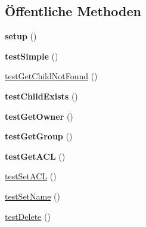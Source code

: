 \subsection*{Öffentliche Methoden}
\begin{DoxyCompactItemize}
\item 
\mbox{\label{class_sabre_1_1_cal_d_a_v_1_1_calendar_home_test_a7abe5412cf17b2038178a631d94a75e1}} 
{\bfseries setup} ()
\item 
\mbox{\label{class_sabre_1_1_cal_d_a_v_1_1_calendar_home_test_afb3e1407821b7b422ea7770ed8153c02}} 
{\bfseries test\+Simple} ()
\item 
\mbox{\hyperlink{class_sabre_1_1_cal_d_a_v_1_1_calendar_home_test_abed1f9c47c720f7e3d31291406a55f22}{test\+Get\+Child\+Not\+Found}} ()
\item 
\mbox{\label{class_sabre_1_1_cal_d_a_v_1_1_calendar_home_test_a83dc6b934462b22f061f1d2e5f73f0bf}} 
{\bfseries test\+Child\+Exists} ()
\item 
\mbox{\label{class_sabre_1_1_cal_d_a_v_1_1_calendar_home_test_aa35e826fcc22ac5b115dfbd2ee6d82a6}} 
{\bfseries test\+Get\+Owner} ()
\item 
\mbox{\label{class_sabre_1_1_cal_d_a_v_1_1_calendar_home_test_ac76802f94b483750b21ca3561fda4157}} 
{\bfseries test\+Get\+Group} ()
\item 
\mbox{\label{class_sabre_1_1_cal_d_a_v_1_1_calendar_home_test_ada46a6b42a5d9ec89161c5c965c2e7bc}} 
{\bfseries test\+Get\+A\+CL} ()
\item 
\mbox{\hyperlink{class_sabre_1_1_cal_d_a_v_1_1_calendar_home_test_a649ff5dfcd570f1766972e843d3068ae}{test\+Set\+A\+CL}} ()
\item 
\mbox{\hyperlink{class_sabre_1_1_cal_d_a_v_1_1_calendar_home_test_a6be08128ae7a4d254fd42b5cb4b4782f}{test\+Set\+Name}} ()
\item 
\mbox{\hyperlink{class_sabre_1_1_cal_d_a_v_1_1_calendar_home_test_a769dd6d2b684ca7c5ca841b8fae30f92}{test\+Delete}} ()
\item 

\end{DoxyCompactItemize}
